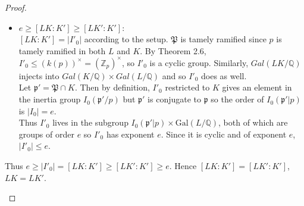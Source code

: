 \begin{proof}
\begin{enumerate}
\begin{itemize}
    \item $e \geq [LK : K'] \geq [LK' : K']$:\\
        $[LK : K'] = |I'_0|$ according to the setup. $\mathfrak{P}$ is tamely ramified since $p$ is tamely ramified in both $L$ and $K$. By Theorem 2.6, $I'_0 \leq (k(p))^\times = (\mathbb{Z}_p)^\times$, so $I'_0$ is a cyclic group. Similarly, $Gal(LK/\mathbb{Q})$ injects into $Gal(K/\mathbb{Q}) \times Gal(L/\mathbb{Q})$ and so $I'_0$ does as well.\\
        Let $\mathfrak{p}' = \mathfrak{P} \cap K$. Then by definition, $I'_0$ restricted to $K$ gives an element in the inertia group $I_0(\mathfrak{p}'/p)$ but $\mathfrak{p}'$ is conjugate to $\mathfrak{p}$ so the order of $I_0(\mathfrak{p}'|p)$ is $|I_0| = e$.\\
        Thus $I'_0$ lives in the subgroup $I_0(\mathfrak{p}'|p) \times \text{Gal}(L/\mathbb{Q})$, both of which are groups of order $e$ so $I'_0$ has exponent $e$. Since it is cyclic and of exponent $e$, $|I'_0| \leq e$.
    \end{itemize}
    Thus $e \geq |I'_0| = [LK : K'] \geq [LK' : K'] \geq e$. Hence $[LK : K'] = [LK' : K']$, $LK = LK'$.
\end{enumerate}


\end{proof}

